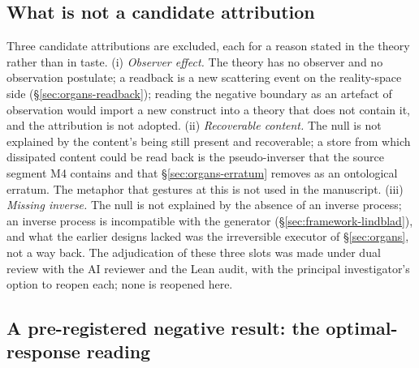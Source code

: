 \documentclass[11pt,a4paper]{article}
\begin{document}
\subsection{What is not a candidate attribution}
\label{sec:boundary-not}

Three candidate attributions are excluded, each for a reason stated in the theory rather than in taste. (i) \emph{Observer effect.} The theory has no observer and no observation postulate; a readback is a new scattering event on the reality-space side (\S\ref{sec:organs-readback}); reading the negative boundary as an artefact of observation would import a new construct into a theory that does not contain it, and the attribution is not adopted. (ii) \emph{Recoverable content.} The null is not explained by the content's being still present and recoverable; a store from which dissipated content could be read back is the pseudo-inverser that the source segment M4 contains and that \S\ref{sec:organs-erratum} removes as an ontological erratum. The metaphor that gestures at this is not used in the manuscript. (iii) \emph{Missing inverse.} The null is not explained by the absence of an inverse process; an inverse process is incompatible with the generator (\S\ref{sec:framework-lindblad}), and what the earlier designs lacked was the irreversible executor of \S\ref{sec:organs}, not a way back. The adjudication of these three slots was made under dual review with the AI reviewer and the Lean audit, with the principal investigator's option to reopen each; none is reopened here.

\subsection{A pre-registered negative result: the optimal-response reading}
\label{sec:boundary-negative}
\end{document}
